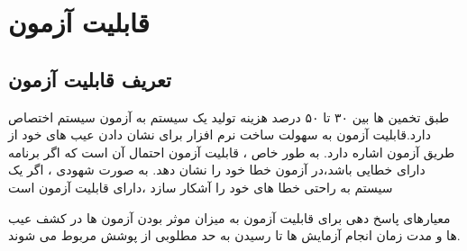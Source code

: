 \chapter{قابلیت آزمون}
\section{تعریف قابلیت آزمون}
طبق تخمین ها بین ۳۰ تا ۵۰ درصد هزینه تولید یک سیستم به آزمون سیستم اختصاص دارد.قابلیت آزمون به سهولت ساخت نرم افزار برای نشان دادن عیب های خود از طریق آزمون اشاره دارد. به طور خاص ، قابلیت آزمون احتمال آن است که اگر برنامه دارای خطایی باشد،‌در آزمون خطا خود را نشان دهد. به صورت شهودی ، اگر یک سیستم به راحتی خطا های خود را آشکار سازد ،‌دارای قابلیت آزمون است

معیارهای پاسخ دهی برای قابلیت آزمون به میزان موثر بودن آزمون ها در کشف عیب ها و مدت زمان انجام آزمایش ها تا رسیدن به حد مطلوبی از پوشش مربوط می شوند.

